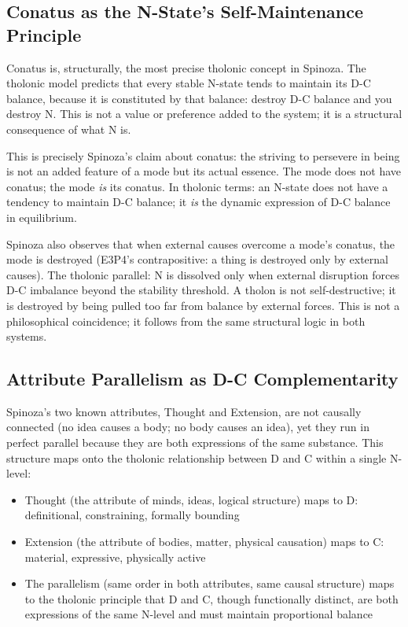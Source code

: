 \documentclass[12pt]{article}
\providecommand{\tightlist}{%
  \setlength{\itemsep}{0pt}\setlength{\parskip}{0pt}}
\begin{document}
\subsection{Conatus as the N-State's Self-Maintenance Principle}\label{conatus-as-the-n-states-self-maintenance-principle}

Conatus is, structurally, the most precise tholonic concept in Spinoza.
The tholonic model predicts that every stable N-state tends to maintain
its D-C balance, because it is constituted by that balance: destroy D-C
balance and you destroy N. This is not a value or preference added to
the system; it is a structural consequence of what N is.

This is precisely Spinoza's claim about conatus: the striving to
persevere in being is not an added feature of a mode but its actual
essence. The mode does not have conatus; the mode \emph{is} its conatus.
In tholonic terms: an N-state does not have a tendency to maintain D-C
balance; it \emph{is} the dynamic expression of D-C balance in
equilibrium.

Spinoza also observes that when external causes overcome a mode's
conatus, the mode is destroyed (E3P4's contrapositive: a thing is
destroyed only by external causes). The tholonic parallel: N is
dissolved only when external disruption forces D-C imbalance beyond the
stability threshold. A tholon is not self-destructive; it is destroyed
by being pulled too far from balance by external forces. This is not a
philosophical coincidence; it follows from the same structural logic in
both systems.

\subsection{Attribute Parallelism as D-C Complementarity}\label{attribute-parallelism-as-d-c-complementarity}

Spinoza's two known attributes, Thought and Extension, are not causally
connected (no idea causes a body; no body causes an idea), yet they run
in perfect parallel because they are both expressions of the same
substance. This structure maps onto the tholonic relationship between D
and C within a single N-level:

\begin{itemize}
\tightlist
\item
  Thought (the attribute of minds, ideas, logical structure) maps to D:
  definitional, constraining, formally bounding
\item
  Extension (the attribute of bodies, matter, physical causation) maps
  to C: material, expressive, physically active
\item
  The parallelism (same order in both attributes, same causal structure)
  maps to the tholonic principle that D and C, though functionally
  distinct, are both expressions of the same N-level and must maintain
  proportional balance
\end{itemize}
\end{document}
